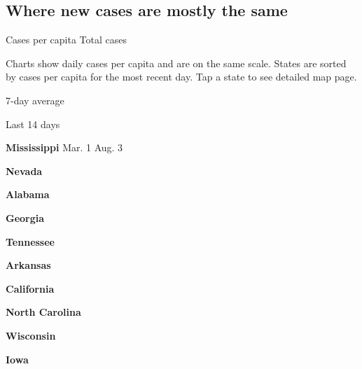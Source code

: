 \hypertarget{where-new-cases-are-mostly-the-same}{%
\subsection{Where new cases are mostly the
same}\label{where-new-cases-are-mostly-the-same}}

Cases per capita Total cases

Charts show daily cases per capita and are on the same scale. States are
sorted by cases per capita for the most recent day. Tap a state to see
detailed map page.

\href{https://www.nytimes.com/interactive/2020/us/mississippi-coronavirus-cases.html}{}

7-day average

Last 14 days

\textbf{Mississippi} Mar. 1 Aug. 3

\href{https://www.nytimes.com/interactive/2020/us/nevada-coronavirus-cases.html}{}

\textbf{Nevada}

\href{https://www.nytimes.com/interactive/2020/us/alabama-coronavirus-cases.html}{}

\textbf{Alabama}

\href{https://www.nytimes.com/interactive/2020/us/georgia-coronavirus-cases.html}{}

\textbf{Georgia}

\href{https://www.nytimes.com/interactive/2020/us/tennessee-coronavirus-cases.html}{}

\textbf{Tennessee}

\href{https://www.nytimes.com/interactive/2020/us/arkansas-coronavirus-cases.html}{}

\textbf{Arkansas}

\href{https://www.nytimes.com/interactive/2020/us/california-coronavirus-cases.html}{}

\textbf{California}

\href{https://www.nytimes.com/interactive/2020/us/north-carolina-coronavirus-cases.html}{}

\textbf{North Carolina}

\href{https://www.nytimes.com/interactive/2020/us/wisconsin-coronavirus-cases.html}{}

\textbf{Wisconsin}

\href{https://www.nytimes.com/interactive/2020/us/iowa-coronavirus-cases.html}{}

\textbf{Iowa}

